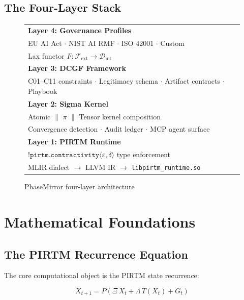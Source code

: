 \documentclass[11pt,letterpaper]{article}
\theoremstyle{remark}
\begin{document}
\subsection{The Four-Layer Stack}

\begin{figure}[H]
\centering
\renewcommand{\arraystretch}{1.4}
\begin{tabular}{|p{11cm}|}
\hline
\textbf{Layer 4: Governance Profiles}\\
EU AI Act $\cdot$ NIST AI RMF $\cdot$ ISO 42001 $\cdot$ Custom\\
Lax functor $F: \mathcal{F}_\text{ext} \to \mathcal{D}_\text{int}$\\
\hline
\textbf{Layer 3: DCGF Framework}\\
C01--C11 constraints $\cdot$ Legitimacy schema $\cdot$ Artifact contracts $\cdot$ Playbook\\
\hline
\textbf{Layer 2: Sigma Kernel}\\
Atomic $\|$ $\pi$ $\|$ Tensor kernel composition\\
Convergence detection $\cdot$ Audit ledger $\cdot$ MCP agent surface\\
\hline
\textbf{Layer 1: PIRTM Runtime}\\
$\texttt{!pirtm.contractivity}\langle\varepsilon,\delta\rangle$ type enforcement\\
MLIR dialect $\to$ LLVM IR $\to$ \texttt{libpirtm\_runtime.so}\\
\hline
\end{tabular}
\caption{PhaseMirror four-layer architecture}
\end{figure}

\section{Mathematical Foundations}

\subsection{The PIRTM Recurrence Equation}

The core computational object is the PIRTM state recurrence:

\begin{equation}
  X_{t+1} = P\!\left(\Xi\, X_t + \Lambda\, T(X_t) + G_t\right)
  \label{eq:recurrence}
\end{equation}
\end{document}
